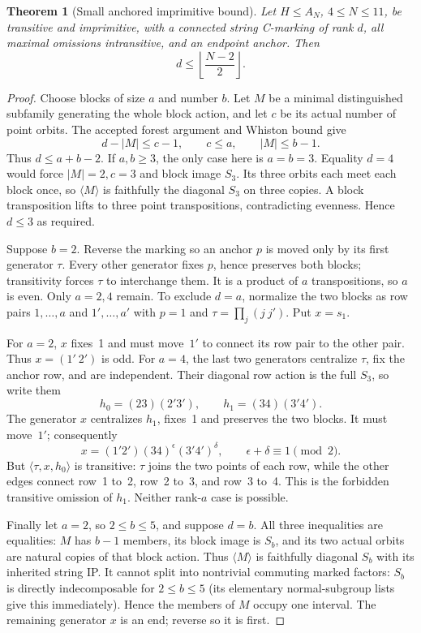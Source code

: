 \documentclass[11pt,a4paper]{article}
\newtheorem{theorem}[lemma]{Theorem}
\newcommand{\gen}[1]{\langle#1\rangle}
\begin{document}
\begin{theorem}[Small anchored imprimitive bound]
Let $H\leq A_N$, $4\leq N\leq11$, be transitive and imprimitive,
with a connected string C-marking of rank $d$, all maximal
omissions intransitive, and an endpoint anchor. Then
\[
                         d\leq\left\lfloor\frac{N-2}{2}\right\rfloor.
\]
\end{theorem}
\begin{proof}
Choose blocks of size $a$ and number $b$. Let $M$ be a minimal
distinguished subfamily generating the whole block action, and
let $c$ be its actual number of point orbits. The accepted forest
argument and Whiston bound give
\[
                 d-|M|\leq c-1,\qquad c\leq a,\qquad |M|\leq b-1.
\]
Thus $d\leq a+b-2$. If $a,b\geq3$, the only case here is
$a=b=3$. Equality $d=4$ would force $|M|=2,c=3$ and block
image $S_3$. Its three orbits each meet each block once, so
$\gen M$ is faithfully the diagonal $S_3$ on three copies.
A block transposition lifts to three point transpositions,
contradicting evenness. Hence $d\leq3$ as required.

Suppose $b=2$. Reverse the marking so an anchor $p$ is moved
only by its first generator $\tau$. Every other generator
fixes $p$, hence preserves both blocks; transitivity forces
$\tau$ to interchange them. It is a product of $a$
transpositions, so $a$ is even. Only $a=2,4$ remain.
To exclude $d=a$, normalize the two blocks as row pairs
$1,\ldots,a$ and $1',\ldots,a'$ with $p=1$ and
$\tau=\prod_j(j\ j')$. Put $x=s_1$.

For $a=2$, $x$ fixes~1 and must move~$1'$ to connect its row
pair to the other pair. Thus $x=(1'\ 2')$ is odd.
For $a=4$, the last two generators centralize $\tau$, fix
the anchor row, and are independent. Their diagonal row action
is the full $S_3$, so write them
\[
       h_0=(23)(2'3'),\qquad h_1=(34)(3'4').
\]
The generator $x$ centralizes $h_1$, fixes~1 and preserves
the two blocks. It must move~$1'$; consequently
\[
             x=(1'2')(34)^\epsilon(3'4')^\delta,
             \qquad \epsilon+\delta\equiv1\pmod2.
\]
But $\gen{\tau,x,h_0}$ is transitive: $\tau$ joins the two
points of each row, while the other edges connect row~1 to~2,
row~2 to~3, and row~3 to~4. This is the forbidden transitive
omission of $h_1$. Neither rank-$a$ case is possible.

Finally let $a=2$, so $2\leq b\leq5$, and suppose $d=b$.
All three inequalities are equalities: $M$ has $b-1$ members,
its block image is $S_b$, and its two actual orbits are
natural copies of that block action. Thus $\gen M$ is
faithfully diagonal $S_b$ with its inherited string IP.
It cannot split into nontrivial commuting marked factors:
$S_b$ is directly indecomposable for $2\leq b\leq5$
(its elementary normal-subgroup lists give this immediately).
Hence the members of $M$ occupy one interval. The remaining
generator $x$ is an end; reverse so it is first.


\end{proof}
\end{document}
